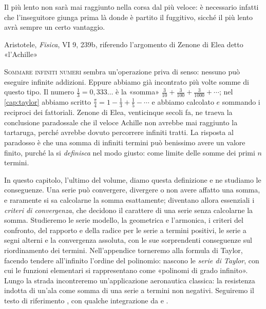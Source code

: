 
\epigraph{Il più lento non sarà mai raggiunto nella corsa dal più veloce: è necessario
infatti che l'inseguitore giunga prima là donde è partito il fuggitivo, sicché il più
lento avrà sempre un certo vantaggio.}{Aristotele, \emph{Fisica}, VI 9, 239b, riferendo
l'argomento di Zenone di Elea detto «l'Achille»}

\lettrine[lines=3, findent=2pt, nindent=0pt]{S}{ommare infiniti numeri} sembra
un'operazione priva di senso: nessuno può eseguire infinite addizioni. Eppure abbiamo già
incontrato più volte somme di questo tipo. Il numero $\frac13=0{,}333\ldots$ è la «somma»
$\frac3{10}+\frac3{100}+\frac3{1000}+\cdots$; nel \cref{cap:taylor} abbiamo scritto
$\frac\pi4=1-\frac13+\frac15-\cdots$ e abbiamo calcolato $e$ sommando i reciproci dei fattoriali.
Zenone di Elea, venticinque secoli fa, ne traeva la conclusione paradossale che il
veloce Achille non avrebbe mai raggiunto la tartaruga, perché avrebbe dovuto percorrere
infiniti tratti. La risposta al paradosso è che una somma di infiniti termini può
benissimo avere un valore finito, purché la si \emph{definisca} nel modo giusto: come
limite delle somme dei primi $n$ termini.

In questo capitolo, l'ultimo del volume, diamo questa definizione e ne studiamo le
conseguenze. Una serie può convergere, divergere o non avere affatto una somma, e
raramente si sa calcolarne la somma esattamente; diventano allora essenziali i
\emph{criteri di convergenza}, che decidono il carattere di una serie senza calcolarne la
somma. Studieremo le serie modello, la geometrica e l'armonica, i criteri del confronto,
del rapporto e della radice per le serie a termini positivi, le serie a segni alterni e
la convergenza assoluta, con le sue sorprendenti conseguenze sul riordinamento dei
termini. Nell'appendice torneremo alla formula di Taylor, facendo tendere all'infinito
l'ordine del polinomio: nascono le \emph{serie di Taylor}, con cui le funzioni
elementari si rappresentano come «polinomi di grado infinito». Lungo la strada
incontreremo un'applicazione aeronautica classica: la resistenza indotta di un'ala come
somma di una serie a termini non negativi. Seguiremo il testo di riferimento
\cite{marcellini-sbordone}, con qualche integrazione da \cite{giusti} e \cite{giusti2}.

